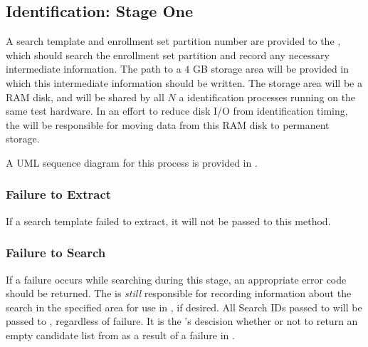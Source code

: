 \subsection{Identification: Stage One}
\label{subsec:api-identification_stage_one}

A search template and enrollment set partition number are provided to the
\implementation, which should search the enrollment set partition and record any
necessary intermediate information. The path to a $4$ GB storage area will be
provided in which this intermediate information should be written. The storage
area will be a RAM disk, and will be shared by all $N$ a identification
processes running on the same test hardware. In an effort to reduce disk I/O
from identification timing, the \testdriver will be responsible for moving data
from this RAM disk to permanent storage.

A UML sequence diagram for this process is provided in
.

\subsubsection{Failure to Extract}
If a search template failed to extract, it will not be passed to this method.

\subsubsection{Failure to Search}
If a failure occurs while searching during this stage, an appropriate error
code should be returned. The \implementation is \textit{still} responsible for
recording information about the search in the specified area for use in
\stagetwoidentification, if desired. All Search IDs passed to 
\stageoneidentification will be passed to \stagetwoidentification, regardless
of failure. It is the \implementation's descision whether or not to return
an empty candidate list from \stagetwoidentification as a result of a failure
in \stageoneidentification. 

